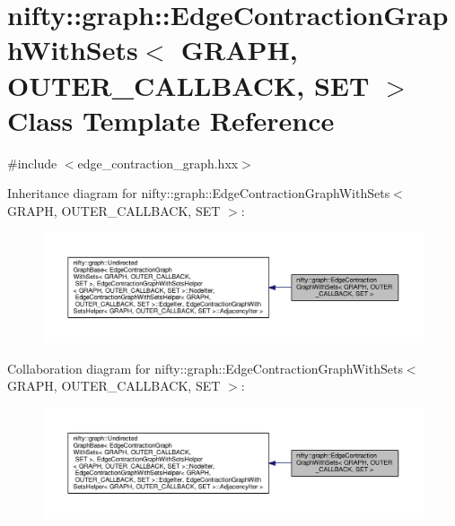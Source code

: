 \hypertarget{classnifty_1_1graph_1_1EdgeContractionGraphWithSets}{}\section{nifty\+:\+:graph\+:\+:Edge\+Contraction\+Graph\+With\+Sets$<$ G\+R\+A\+P\+H, O\+U\+T\+E\+R\+\_\+\+C\+A\+L\+L\+B\+A\+C\+K, S\+E\+T $>$ Class Template Reference}
\label{classnifty_1_1graph_1_1EdgeContractionGraphWithSets}


{\ttfamily \#include $<$edge\+\_\+contraction\+\_\+graph.\+hxx$>$}



Inheritance diagram for nifty\+:\+:graph\+:\+:Edge\+Contraction\+Graph\+With\+Sets$<$ G\+R\+A\+P\+H, O\+U\+T\+E\+R\+\_\+\+C\+A\+L\+L\+B\+A\+C\+K, S\+E\+T $>$\+:\nopagebreak
\begin{figure}[H]
\begin{center}
\leavevmode
\includegraphics[width=350pt]{classnifty_1_1graph_1_1EdgeContractionGraphWithSets__inherit__graph}
\end{center}
\end{figure}


Collaboration diagram for nifty\+:\+:graph\+:\+:Edge\+Contraction\+Graph\+With\+Sets$<$ G\+R\+A\+P\+H, O\+U\+T\+E\+R\+\_\+\+C\+A\+L\+L\+B\+A\+C\+K, S\+E\+T $>$\+:\nopagebreak
\begin{figure}[H]
\begin{center}
\leavevmode
\includegraphics[width=350pt]{classnifty_1_1graph_1_1EdgeContractionGraphWithSets__coll__graph}
\end{center}
\end{figure}
